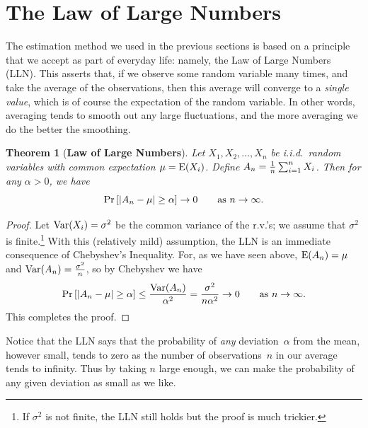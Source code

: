 \documentclass[11pt]{article}
\def\Ex#1{{\rm E}(#1)}
\def\Var#1{{\rm Var}(#1)}
\newcounter{thm}
\newtheorem{theorem}{Theorem}[thm]
\begin{document}
\section*{The Law of Large Numbers}
The estimation method we used in the previous sections is based
on a principle that we accept as part of everyday life: namely, the
Law of Large Numbers (LLN).  This asserts that, if we observe some
random variable many times, and take the average of the
observations, then this average will converge to a {\it single
value}, which is of course the expectation of the random variable.
In other words, averaging tends to smooth out any large
fluctuations, and the more averaging we do the better the smoothing.

\begin{theorem}[{\bf Law of Large Numbers}]
Let $X_1,X_2,\ldots,X_n$ be i.i.d.\ random variables with common
expectation $\mu=\Ex{X_i}$.  Define $A_n={1\over n}\sum_{i=1}^n
X_i$. Then for any $\alpha>0$, we have $$
 \Pr\left[|A_n-\mu|\ge\alpha\right] \to 0 \qquad\hbox{\rm as $n\to\infty$}.$$
\end{theorem}

\begin{proof}
Let $\Var{X_i}=\sigma^2$ be the common variance of the r.v.'s; we
assume that $\sigma^2$ is finite.\footnote{If $\sigma^2$ is not
finite, the LLN still holds but the proof is much trickier.} With
this (relatively mild) assumption, the LLN is an immediate
consequence of Chebyshev's Inequality. For, as we have seen above,
$\Ex{A_n}=\mu$ and $\Var{A_n}=\frac{\sigma^2}{n}$, so by Chebyshev
we have $$
 \Pr\left[|A_n-\mu|\ge\alpha\right] \le \frac{\Var{A_n}}{\alpha^2} = \frac{\sigma^2}{n\alpha^2}  \to 0 \qquad\hbox{\rm as $n\to\infty$}.$$
This completes the proof.
\end{proof}

Notice that the LLN says that the probability of {\it any\/}
deviation~$\alpha$ from the mean, however small, tends to zero as
the number of observations~$n$ in our average tends to infinity.
Thus by taking $n$ large enough, we can make the probability of any
given deviation as small as we like.
\end{document}
